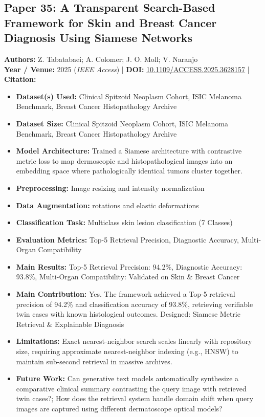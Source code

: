 \documentclass[11pt,a4paper]{article}
\begin{document}
\subsection{Paper 35: A Transparent Search-Based Framework for Skin and Breast Cancer Diagnosis Using Siamese Networks}
\textbf{Authors:} Z. Tabatabaei; A. Colomer; J. O. Moll; V. Naranjo \\
\textbf{Year / Venue:} 2025 (\textit{IEEE Access}) | \textbf{DOI:} \href{https://doi.org/10.1109/ACCESS.2025.3628157}{10.1109/ACCESS.2025.3628157} | \textbf{Citation:} \cite{11224374}

\begin{itemize}\small
\item \textbf{Dataset(s) Used:} Clinical Spitzoid Neoplasm Cohort, ISIC Melanoma Benchmark, Breast Cancer Histopathology Archive
\item \textbf{Dataset Size:} Clinical Spitzoid Neoplasm Cohort, ISIC Melanoma Benchmark, Breast Cancer Histopathology Archive
\item \textbf{Model Architecture:} Trained a Siamese architecture with contrastive metric loss to map dermoscopic and histopathological images into an embedding space where pathologically identical tumors cluster together.
\item \textbf{Preprocessing:} Image resizing and intensity normalization
\item \textbf{Data Augmentation:} rotations and elastic deformations
\item \textbf{Classification Task:} Multiclass skin lesion classification (7 Classes)
\item \textbf{Evaluation Metrics:} Top-5 Retrieval Precision, Diagnostic Accuracy, Multi-Organ Compatibility
\item \textbf{Main Results:} Top-5 Retrieval Precision: 94.2\%, Diagnostic Accuracy: 93.8\%, Multi-Organ Compatibility: Validated on Skin \& Breast Cancer
\item \textbf{Main Contribution:} Yes. The framework achieved a Top-5 retrieval precision of 94.2\% and classification accuracy of 93.8\%, retrieving verifiable twin cases with known histological outcomes. Designed: Siamese Metric Retrieval \& Explainable Diagnosis
\item \textbf{Limitations:} Exact nearest-neighbor search scales linearly with repository size, requiring approximate nearest-neighbor indexing (e.g., HNSW) to maintain sub-second retrieval in massive archives.
\item \textbf{Future Work:} Can generative text models automatically synthesize a comparative clinical summary contrasting the query image with retrieved twin cases?; How does the retrieval system handle domain shift when query images are captured using different dermatoscope optical models?

\end{itemize}
\end{document}
